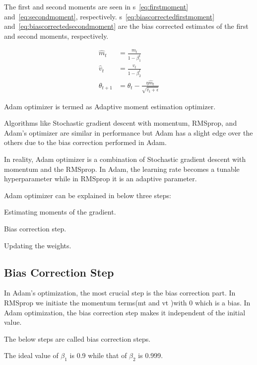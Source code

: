 The first and second moments are seen in \equationname{}s~\ref{eq:firstmoment} and~\ref{eq:secondmoment}, respectively.  \equationname{}s~\ref{eq:biascorrectedfirstmoment} and~\ref{eq:biascorrectedsecondmoment} are the bias corrected estimates of the first and second moments, respectively.

	\begin{align}
		\hat{m}_t     &= \frac{m_t}{1-\beta_1^t }    \label{eq:biascorrectedfirstmoment} \\
		\hat{v}_t     &= \frac{v_t}{1-\beta_2^t} \label{eq:biascorrectedsecondmoment}    \\
		\theta_{t+1}  &= \theta_t - \frac{\eta \hat{m}_t}{\sqrt{\hat{v}_t+\epsilon}}
	\end{align}

	\begin{bulletedlist}
		\item Adam optimizer is termed as Adaptive moment estimation optimizer.
		\item Algorithms like Stochastic gradient descent with momentum, RMSprop, and Adam's optimizer are similar in performance but Adam has a slight edge over the others due to the
bias correction performed in Adam.
		\item In reality, Adam optimizer is a combination of Stochastic gradient descent with momentum and the RMSprop.  In Adam, the learning rate becomes a tunable hyperparameter while in RMSprop it is an adaptive parameter.
		\item Adam optimizer can be explained in below three steps:
		\begin{numberedlist}
			\item Estimating moments of the gradient.
			\item Bias correction step.
			\item Updating the weights.
		\end{numberedlist}
	\end{bulletedlist}

	\subsection{Bias Correction Step}
	\begin{bulletedlist}
		\item In Adam's optimization, the most crucial step is the bias correction part.  In RMSprop we initiate the momentum terms(mt and vt )with 0 which is a bias. In Adam optimization, the bias correction step makes it independent of the initial value.
		\item The below steps are called bias correction steps.
		\item The ideal value of $\beta_1$ is 0.9 while that of $\beta_2$ is 0.999.
	\end{bulletedlist}

